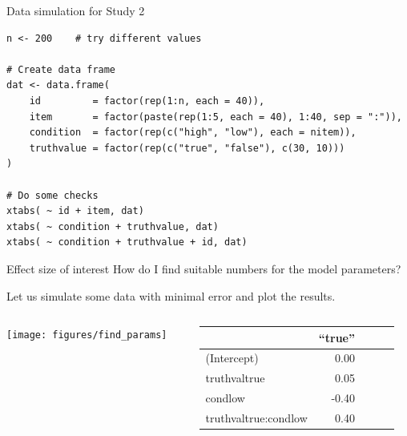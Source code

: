 \documentclass[aspectratio=169]{beamer}
\begin{document}
{

\begin{frame}[fragile]{Data simulation for Study 2}
\begin{lstlisting}
n <- 200    # try different values

# Create data frame
dat <- data.frame(
    id         = factor(rep(1:n, each = 40)),
    item       = factor(paste(rep(1:5, each = 40), 1:40, sep = ":")),
    condition  = factor(rep(c("high", "low"), each = nitem)),
    truthvalue = factor(rep(c("true", "false"), c(30, 10)))
)

# Do some checks
xtabs( ~ id + item, dat)
xtabs( ~ condition + truthvalue, dat)
xtabs( ~ condition + truthvalue + id, dat)
\end{lstlisting}
\end{frame}

}


\begin{frame}{Effect size of interest}
  How do I find suitable numbers for the model parameters?

  Let us simulate some data with minimal error and plot the results.
\begin{columns}
  \begin{column}[c]{.7\textwidth}
    \texttt{[image: figures/find\_params]}
  \end{column}
  \begin{column}[c]{.3\textwidth}
    {\footnotesize
        \begin{tabular}{@{}lrrrr}
  \hline
 & ``true'' \\ 
  \hline
  (Intercept)          &  0.00 \\ 
  truthvaltrue         &  0.05 \\ 
  condlow              & -0.40  \\ 
  truthvaltrue:condlow &  0.40 \\ 
   \hline
\end{tabular}
%
    }
  \end{column}
\end{columns}

\end{frame}
\end{document}
